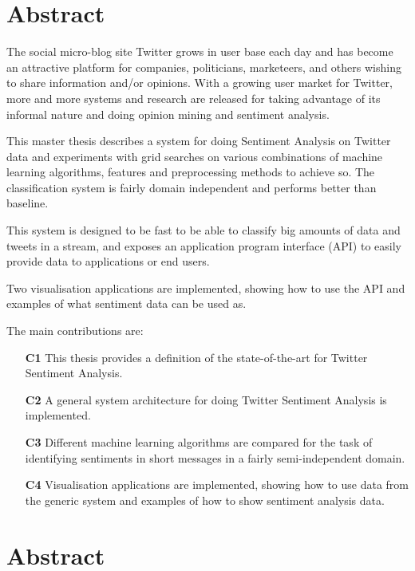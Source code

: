 \section*{Abstract}

The social micro-blog site Twitter grows in user base each day and has become an attractive platform for companies, politicians, marketeers, and others wishing to share information and/or opinions. With a growing user market for Twitter, more and more systems and research are released for taking advantage of its informal nature and doing opinion mining and sentiment analysis. 

This master thesis describes a system for doing Sentiment Analysis on Twitter data and experiments with grid searches on various combinations of machine learning algorithms, features and preprocessing methods to achieve so. The classification system is fairly domain independent and performs better than baseline. 

This system is designed to be fast to be able to classify big amounts of data and tweets in a stream, and exposes an application program interface (API) to easily provide data to applications or end users. 

Two visualisation applications are implemented, showing how to use the API and examples of what sentiment data can be used as.

The main contributions are: 

\begin{itemize}
\item[\textbf{C1}] This thesis provides a definition of the state-of-the-art for Twitter Sentiment Analysis.

\item[\textbf{C2}] A general system architecture for doing Twitter Sentiment Analysis is implemented. 

\item[\textbf{C3}] Different machine learning algorithms are compared for the task of identifying sentiments in short messages in a fairly semi-independent domain.

\item[\textbf{C4}] Visualisation applications are implemented, showing how to use data from the generic system and examples of how to show sentiment analysis data.
\end{itemize}

\clearpage

\section*{Abstract}

